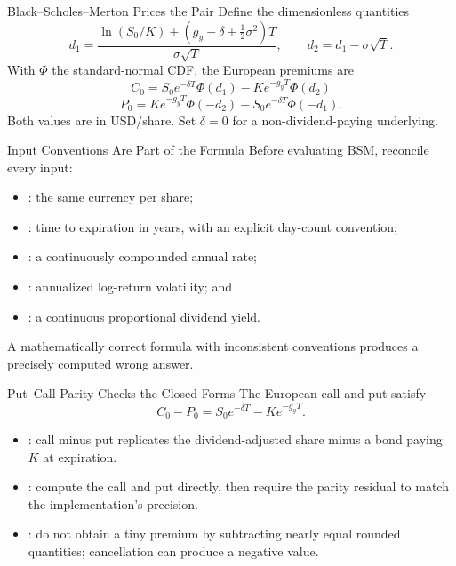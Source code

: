 \documentclass[aspectratio=169,11pt]{beamer}
\newcommand{\gy}{g_y}
\begin{document}
\begin{frame}{Black--Scholes--Merton Prices the Pair}
  Define the dimensionless quantities
  \[
    d_1=\frac{\ln(S_0/K)+(\gy-\delta+\tfrac12\sigma^2)T}{\sigma\sqrt T},
    \qquad d_2=d_1-\sigma\sqrt T.
  \]
  With $\Phi$ the standard-normal CDF, the European premiums are
  \[
    \boxed{C_0=S_0e^{-\delta T}\Phi(d_1)-Ke^{-\gy T}\Phi(d_2)}
  \]
  \[
    \boxed{P_0=Ke^{-\gy T}\Phi(-d_2)-S_0e^{-\delta T}\Phi(-d_1).}
  \]
  Both values are in USD/share. Set $\delta=0$ for a non-dividend-paying
  underlying.
\end{frame}

\begin{frame}{Input Conventions Are Part of the Formula}
  Before evaluating BSM, reconcile every input:
  \begin{itemize}\setlength{\itemsep}{0.45em}
    \item {}: the same currency per share;
    \item {}: time to expiration in years, with an explicit day-count
      convention;
    \item \hilite{$\gy$}: a continuously compounded annual rate;
    \item \hilite{$\sigma$}: annualized log-return volatility; and
    \item \hilite{$\delta$}: a continuous proportional dividend yield.
  \end{itemize}
  A mathematically correct formula with inconsistent conventions produces a
  precisely computed wrong answer.
\end{frame}

\begin{frame}{Put--Call Parity Checks the Closed Forms}
  The European call and put satisfy
  \[
    \boxed{C_0-P_0=S_0e^{-\delta T}-Ke^{-\gy T}.}
  \]
  \begin{itemize}\setlength{\itemsep}{0.4em}
    \item {}: call minus put replicates the
      dividend-adjusted share minus a bond paying $K$ at expiration.
    \item {}: compute the call and put directly, then
      require the parity residual to match the implementation's precision.
    \item {}: do not obtain a tiny premium by subtracting
      nearly equal rounded quantities; cancellation can produce a negative value.
  \end{itemize}
\end{frame}
\end{document}
